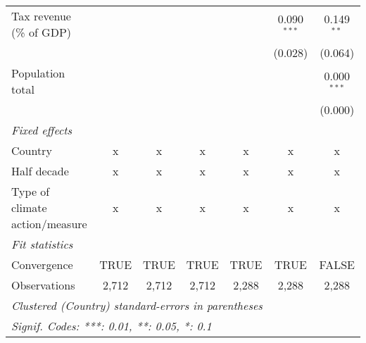 \begin{tabular}{lcccccc}
   Tax revenue (\% of GDP)                                        &                &                &                &                & 0.090$^{***}$  & 0.149$^{**}$\\   
                                                                  &                &                &                &                & (0.028)        & (0.064)\\   
   Population total                                               &                &                &                &                &                & 0.000$^{***}$\\   
                                                                  &                &                &                &                &                & (0.000)\\   
   \emph{Fixed effects}\\
   Country                                                        & x              & x              & x              & x              & x              & x\\  
   Half decade                                                    & x              & x              & x              & x              & x              & x\\  
   Type of climate action/measure                                 & x              & x              & x              & x              & x              & x\\  
   \midrule \emph{Fit statistics}\\
   Convergence                                                    &TRUE            & TRUE           & TRUE           & TRUE           & TRUE           & FALSE\\  
   Observations                                                   & 2,712          & 2,712          & 2,712          & 2,288          & 2,288          & 2,288\\  
   \midrule
   \multicolumn{7}{l}{\emph{Clustered (Country) standard-errors in parentheses}}\\
   \multicolumn{7}{l}{\emph{Signif. Codes: ***: 0.01, **: 0.05, *: 0.1}}\\
\end{tabular}
\par\endgroup


